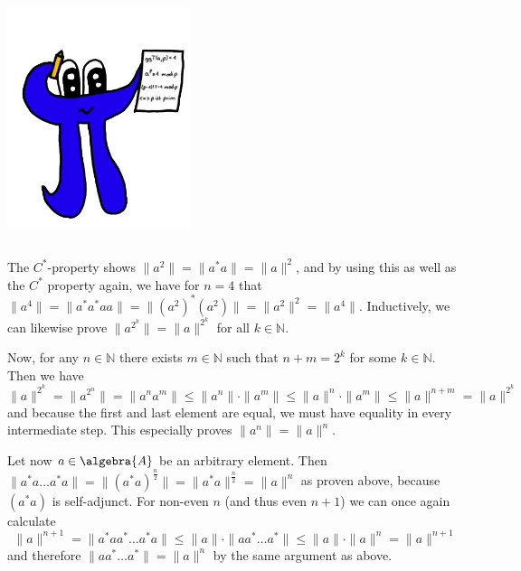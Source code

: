 \documentclass[a4paper]{article}
\begin{document}
\makeexheader

\begin{center}
    \includegraphics*[width=0.4\textwidth]{pi.png}
\end{center}

\setcounter{subsection}{1}

\subsection{}

The $C^*$-property shows $\|a^2\| = \|a^* a \| = \|a\|^2$, and by using this as well as the $C^*$ property again, we have for $n = 4$ that $\|a^4\| = \|a^* a^* a a\| = \|(a^2)^* (a^2)\| = \|a^2\|^2 = \|a^4\|$.
Inductively, we can likewise prove $\|a^{2^k}\| = \|a\|^{2^k}$ for all $k \in \mathds{N}$.

Now, for any $n \in \mathds{N}$ there exists $m \in \mathds{N}$ such that $n + m = 2^k$ for some $k \in \mathds{N}$. Then we have
\begin{equation*}
    \|a\|^{2^k} = \|a^{2^n}\| = \|a^n a^m\| \leq \|a^n\| \cdot \|a^m\| \leq \|a\|^n \cdot \|a^m\| \leq \|a\|^{n+m} = \|a\|^{2^k}
\end{equation*}
and because the first and last element are equal, we must have equality in every intermediate step.
This especially proves $\|a^n\| = \|a\|^n$.

Let now $a \in \algebra{A}$ be an arbitrary element.
Then $\|a^* a \dots a^* a\| = \|(a^* a)^\frac{n}{2}\| = \|a^* a\|^\frac{n}{2} = \|a\|^n$ as proven above, because $(a^* a)$ is self-adjunct.
For non-even $n$ (and thus even $n+1$) we can once again calculate
\begin{equation*}
    \|a\|^{n+1} = \|a^* a a^* \dots a^* a \| \leq \|a\| \cdot \|a a^* \dots a^*\| \leq \|a\| \cdot \|a\|^{n} = \|a\|^{n+1}
\end{equation*}
and therefore $\|a a^* \dots a^*\| = \|a\|^n$ by the same argument as above.
\end{document}

